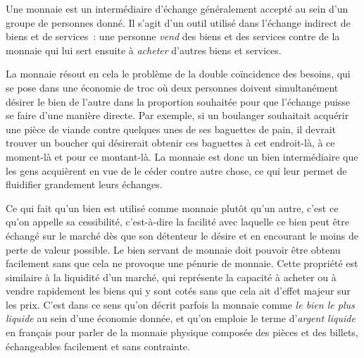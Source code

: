 Une monnaie est un intermédiaire d'échange généralement accepté au sein d'un groupe de personnes donné. Il s'agit d'un outil utilisé dans l'échange indirect de biens et de services~: une personne \emph{vend} des biens et des services contre de la monnaie qui lui sert ensuite à \emph{acheter} d'autres biens et services.

La monnaie résout en cela le problème de la double coïncidence des besoins, qui se pose dans une économie de troc où deux personnes doivent simultanément désirer le bien de l'autre dans la proportion souhaitée pour que l'échange puisse se faire d'une manière directe. Par exemple, si un boulanger souhaitait acquérir une pièce de viande contre quelques unes de ses baguettes de pain, il devrait trouver un boucher qui désirerait obtenir ces baguettes à cet endroit-là, à ce moment-là et pour ce montant-là. La monnaie est donc un bien intermédiaire que les gens acquièrent en vue de le céder contre autre chose, ce qui leur permet de fluidifier grandement leurs échanges.

Ce qui fait qu'un bien est utilisé comme monnaie plutôt qu'un autre, c'est ce qu'on appelle sa cessibilité, c'est-à-dire la facilité avec laquelle ce bien peut être échangé sur le marché dès que son détenteur le désire et en encourant le moins de perte de valeur possible. Le bien servant de monnaie doit pouvoir être obtenu facilement sans que cela ne provoque une pénurie de monnaie. Cette propriété est similaire à la liquidité d'un marché, qui représente la capacité à acheter ou à vendre rapidement les biens qui y sont cotés sans que cela ait d'effet majeur sur les prix. C'est dans ce sens qu'on décrit parfois la monnaie comme \emph{le bien le plus liquide} au sein d'une économie donnée, et qu'on emploie le terme d'\emph{argent liquide} en français pour parler de la monnaie physique composée des pièces et des billets, échangeables facilement et sans contrainte.

